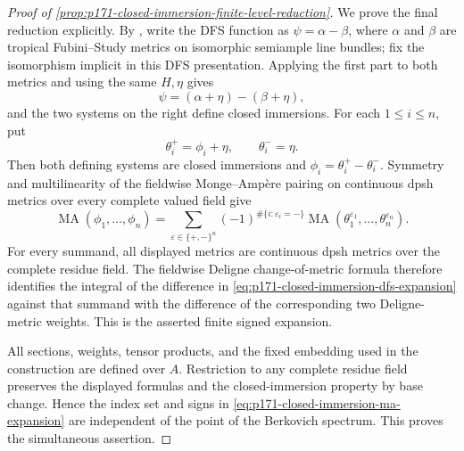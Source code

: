 \begin{proof}[Proof of
\cref{prop:p171-closed-immersion-finite-level-reduction}]
We prove the final reduction explicitly.  By
\cite[Definition~2.15]{PS23Hybrid}, write the DFS function as
\(\psi=\alpha-\beta\), where \(\alpha\) and \(\beta\) are tropical
Fubini--Study metrics on isomorphic semiample line bundles; fix the
isomorphism implicit in this DFS presentation.  Applying the first part to
both metrics and using the same \(H,\eta\) gives
\begin{equation}
\label{eq:p171-closed-immersion-dfs-expansion}
                    \psi=(\alpha+\eta)-(\beta+\eta),
\end{equation}
and the two systems on the right define closed immersions.  For each
\(1\leq i\leq n\), put
\[
                  \theta_i^+=\phi_i+\eta,
                  \qquad \theta_i^-=\eta.
\]
Then both defining systems are closed immersions and
\(\phi_i=\theta_i^+-\theta_i^-\).  Symmetry and multilinearity of the
fieldwise Monge--Amp\`ere pairing on continuous dpsh metrics over every
complete valued field
\cite[Proposition~8.5, Definition~8.7, and the paragraph following
Definition~8.7]{BE21} give
\begin{equation}
\label{eq:p171-closed-immersion-ma-expansion}
 \operatorname{MA}(\phi_1,\ldots,\phi_n)
 =\sum_{\varepsilon\in\{+,-\}^n}
   (-1)^{\#\{i:\varepsilon_i=-\}}
   \operatorname{MA}(\theta_1^{\varepsilon_1},\ldots,
                     \theta_n^{\varepsilon_n}).
\end{equation}
For every summand, all displayed metrics are continuous dpsh metrics over
the complete residue field.  The fieldwise Deligne change-of-metric formula
\cite[Theorem~8.16 and formula~(8.9)]{BE21} therefore identifies the integral
of the difference in
\eqref{eq:p171-closed-immersion-dfs-expansion} against that summand with
the difference of the corresponding two Deligne-metric weights.  This is
the asserted finite signed expansion.

All sections, weights, tensor products, and the fixed embedding used in
the construction are defined over \(A\).  Restriction to any complete
residue field preserves the displayed formulas and the closed-immersion
property by base change.  Hence the index set and signs in
\eqref{eq:p171-closed-immersion-ma-expansion} are independent of the point
of the Berkovich spectrum.  This proves the simultaneous assertion.
\end{proof}
